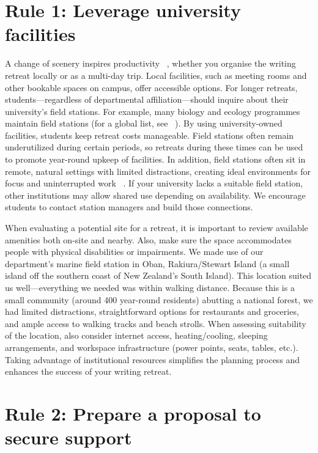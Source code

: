 \documentclass[10pt,letterpaper]{article}
\begin{document}
\section*{Rule 1: Leverage university facilities}

A change of scenery inspires productivity ~\cite{murray2013}, whether you organise the writing retreat locally or as a multi-day trip. Local facilities, such as meeting rooms and other bookable spaces on campus, offer accessible options. For longer retreats, students---regardless of departmental affiliation---should inquire about their university's field stations. For example, many biology and ecology programmes maintain field stations (for a global list, see ~\cite{tydecks2016}). By using university-owned facilities, students keep retreat costs manageable. Field stations often remain underutilized during certain periods, so retreats during these times can be used to promote year-round upkeep of facilities. In addition, field stations often sit in remote, natural settings with limited distractions, creating ideal environments for focus and uninterrupted work ~\cite{murray2013, tremblay2021}. If your university lacks a suitable field station, other institutions may allow shared use depending on availability. We encourage students to contact station managers and build those connections.

When evaluating a potential site for a retreat, it is important to review available amenities both on-site and nearby. Also, make sure the space accommodates people with physical disabilities or impairments. We made use of our department's marine field station in Oban, Rakiura/Stewart Island (a small island off the southern coast of New Zealand's South Island). This location suited us well---everything we needed was within walking distance. Because this is a small community (around 400 year-round residents) abutting a national forest, we had limited distractions, straightforward options for restaurants and groceries, and ample access to walking tracks and beach strolls. When assessing suitability of the location, also consider internet access, heating/cooling, sleeping arrangements, and workspace infrastructure (power points, seats, tables, etc.). Taking advantage of institutional resources simplifies the planning process and enhances the success of your writing retreat.

\section*{Rule 2: Prepare a proposal to secure support}
\end{document}
